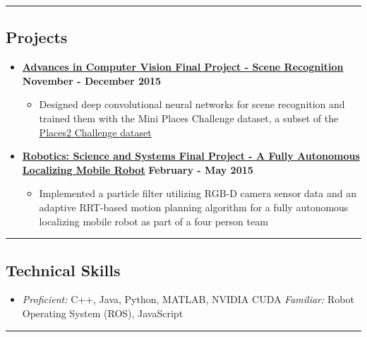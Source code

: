 \documentclass[10pt,letterpaper]{article}
\begin{document}
\hrule
\vspace{-0.6em}

\subsection*{Projects}
  \begin{itemize}
    \parskip=-0.1em
    
    \item[]
    {\href{http://6.869.csail.mit.edu/}{\textbf{Advances in Computer Vision Final Project - Scene Recognition}} \hfill
      \textbf{November - December 2015}}

    \begin{itemize}[label=\textbullet]
      \itemsep0em
      \item Designed deep convolutional neural networks for scene recognition and trained them with the Mini Places Challenge dataset, a subset of the \href{http://places2.csail.mit.edu/}{Places2 Challenge dataset} 
      \end{itemize}    
    
    \item[]
    {\href{http://courses.csail.mit.edu/rss/}{\textbf{Robotics: Science and Systems Final Project - A Fully Autonomous Localizing Mobile Robot}} \hfill
      \textbf{February - May 2015}}

    \begin{itemize}[label=\textbullet]
      \itemsep0em
      \item Implemented a particle filter utilizing RGB-D camera sensor data and an adaptive RRT-based motion planning algorithm for a fully autonomous localizing mobile robot as part of a four person team
      \end{itemize}    
\end{itemize}

\hrule
\vspace{-0.6em}

\subsection*{Technical Skills}
\begin{itemize}
	\item[]\emph{Proficient:} C++, Java, Python, MATLAB, NVIDIA CUDA \emph{Familiar:}  Robot Operating System (ROS), JavaScript
\end{itemize}

\hrule
\vspace{-0.6em}
\end{document}
